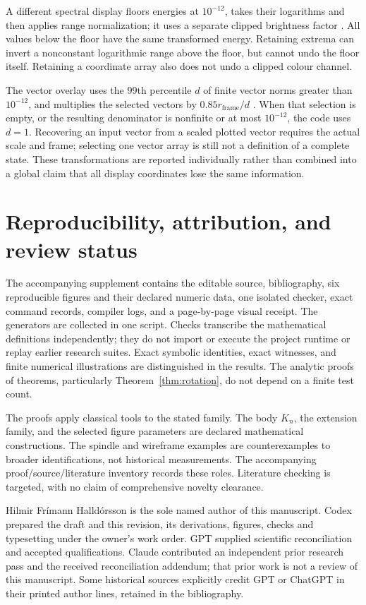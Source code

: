 \documentclass[11pt,a4paper]{article}
\theoremstyle{definition}
\theoremstyle{remark}
\begin{document}
A different spectral display floors energies at $10^{-12}$,
takes their logarithms and then applies range normalization;
it uses a separate clipped brightness factor
\cite[lines 537--549]{viewer}. All values below the floor
have the same transformed energy. Retaining extrema can
invert a nonconstant logarithmic range above the floor,
but cannot undo the floor itself. Retaining a coordinate
array also does not undo a clipped colour channel.

The vector overlay uses the $99$th percentile $d$ of finite
vector norms greater than $10^{-12}$, and multiplies the
selected vectors by $0.85r_{\mathrm{frame}}/d$
\cite[lines 652--665]{viewer}. When that selection is empty,
or the resulting denominator is nonfinite or at most
$10^{-12}$, the code uses $d=1$. Recovering an input vector
from a scaled plotted vector requires the actual scale and
frame; selecting one vector array is still not a definition
of a complete state. These transformations are reported
individually rather than combined into a global claim that
all display coordinates lose the same information.

\section{Reproducibility, attribution, and review status}
\label{app:repro}
The accompanying supplement contains the editable source,
bibliography, six reproducible figures and their declared
numeric data, one isolated checker, exact command records,
compiler logs, and a page-by-page visual receipt. The
generators are collected in one script. Checks transcribe
the mathematical definitions independently; they do not
import or execute the project runtime or replay earlier
research suites. Exact symbolic identities, exact witnesses,
and finite numerical illustrations are distinguished in
the results. The analytic proofs of theorems, particularly
Theorem~\ref{thm:rotation}, do not depend on a finite
test count.

The proofs apply classical tools to the stated family.
The body $K_n$, the extension family, and the selected
figure parameters are declared mathematical constructions.
The spindle and wireframe examples are counterexamples
to broader identifications, not historical measurements.
The accompanying proof/source/literature inventory records
these roles. Literature checking is targeted, with no claim
of comprehensive novelty clearance.

Hilmir Frímann Halldórsson is the sole named author of this
manuscript. Codex prepared the draft and this revision, its derivations,
figures, checks and typesetting under the owner's work
order. GPT supplied scientific reconciliation and accepted
qualifications. Claude contributed an independent prior
research pass and the received reconciliation addendum;
that prior work is not a review of this manuscript.
Some historical sources explicitly credit GPT or ChatGPT
in their printed author lines, retained in the bibliography.
\end{document}
